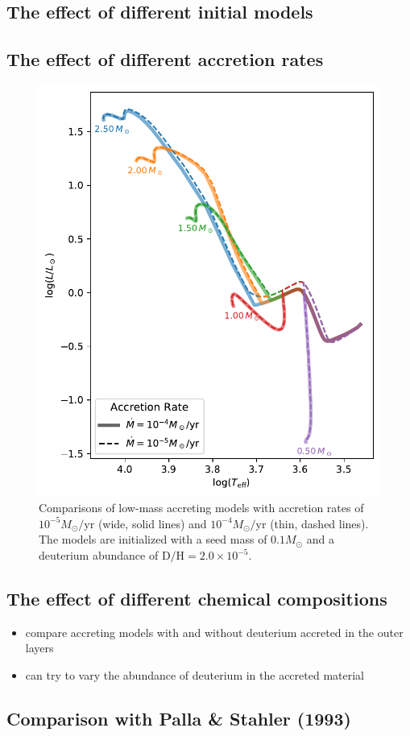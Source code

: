 \documentclass[12pt,a4paper]{article}
\newcommand{\mr}{\mathrm}
\newenvironment{outline}[1]{%
  \begin{itemize}[label=\textbullet]%
  \color{#1}%
}{%
  \end{itemize}%
}
\begin{document}
\subsection{The effect of different initial models}
\label{sec:initial_models}

\subsection{The effect of different accretion rates}
\label{sec:accretion_rate}

\begin{figure}
  \centering  
  \includegraphics[width=.5\textwidth,keepaspectratio]{comp_accrate.pdf}
  \caption{Comparisons of low-mass accreting models with accretion rates of $10^{-5} M_\odot/\mr{yr}$ (wide, solid lines) and $10^{-4} M_\odot/\mr{yr}$ (thin, dashed lines). The models are initialized with a seed mass of $0.1 M_\odot$ and a deuterium abundance of $\mr{D/H} = 2.0\times 10^{-5}$.} \label{fig:comp_accrate}
\end{figure}

\subsection{The effect of different chemical compositions}
\label{sec:chemical_composition}

\begin{outline}{gray}
  \item compare accreting models with and without deuterium accreted in the outer layers
  \item can try to vary the abundance of deuterium in the accreted material
\end{outline}

\subsection{Comparison with Palla \& Stahler (1993)}
\label{sec:comp_palla_stahler}
\end{document}
